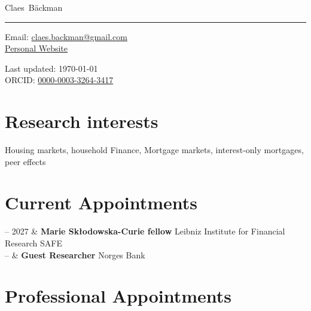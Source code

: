 \documentclass[11pt, a4paper]{article}
\makeatletter
\newcommand{\FirstName}{Claes}
\newcommand{\LastName}{Bäckman}
\newcommand{\MyName}{\FirstName\ \LastName}
\newcommand{\Email}{claes.backman@gmail.com}
\newcommand{\PersonalWebsite}{https://sites.google.com/view/claesbackman/home}
\newcommand{\ORCID}{0000-0003-3264-3417}
\newcommand{\Duration}[2]{\fontsize{10pt}{0}\selectfont #1 -- #2}
\newcommand{\AppointmentTwo}[2]{\textbf{#1} \newline #2}
\makeatother
\begin{document}
	
	\thispagestyle{empty}
	
	{\fontsize{22pt}{0}\selectfont\MyName}\\[-0.1cm]
	\rule{\textwidth}{0.2pt}
	\begin{minipage}[t]{0.595\textwidth}
	Email: \href{mailto:\Email}{\Email} \\
	\href{https://www.\PersonalWebsite}{Personal Website}
	\end{minipage}
	\begin{minipage}[t]{0.405\textwidth}
		\begin{flushright}
			Last updated: \monthyear\today
			\\
			ORCID: \href{https://orcid.org/\ORCID}{\ORCID}
			\\
		\end{flushright}
	\end{minipage}
%	
	\section{Research interests}
	Housing markets, household Finance, Mortgage markets, interest-only mortgages, peer effects 
	
	
	\section{Current Appointments}
	
	
	\begin{EntriesTable}
		\Duration{2025}{2027}  &  \AppointmentTwo{Marie Skłodowska-Curie fellow}{Leibniz Institute for Financial Research SAFE} \\ 
		\Duration{2025}{} & \AppointmentTwo{Guest Researcher}{Norges Bank}
	
	\end{EntriesTable}
	
	\section{Professional Appointments}
	
\end{document}
